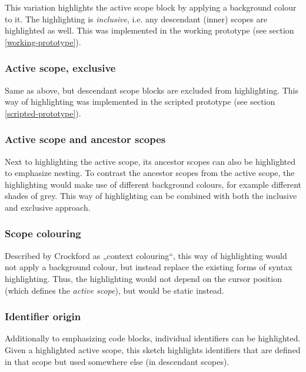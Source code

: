 This variation highlights the active scope block by applying a
background colour to it. The highlighting is \emph{inclusive}, i.e. any
descendant (inner) scopes are highlighted as well. This was implemented
in the working prototype (see section \ref{working-prototype}).

\subsubsection{Active scope, exclusive}\label{active-scope-exclusive}

Same as above, but descendant scope blocks are excluded from
highlighting. This way of highlighting was implemented in the scripted
prototype (see section \ref{scripted-prototype}).

\subsubsection{Active scope and ancestor
scopes}\label{active-scope-and-ancestor-scopes}

Next to highlighting the active scope, its ancestor scopes can also be
highlighted to emphasize nesting. To contrast the ancestor scopes from
the active scope, the highlighting would make use of different
background colours, for example different shades of grey. This way of
highlighting can be combined with both the inclusive and exclusive
approach.

\subsubsection{Scope colouring}\label{scope-colouring}

Described by Crockford \citeyear{crockford} as „context colouring“, this
way of highlighting would not apply a background colour, but instead
replace the existing forms of syntax highlighting. Thus, the
highlighting would not depend on the cursor position (which defines the
\emph{active scope}), but would be static instead.

\subsubsection{Identifier origin}\label{identifier-origin}

Additionally to emphasizing code blocks, individual identifiers can be
highlighted. Given a highlighted active scope, this sketch highlights
identifiers that are defined in that scope but used somewhere else (in
descendant scopes).

